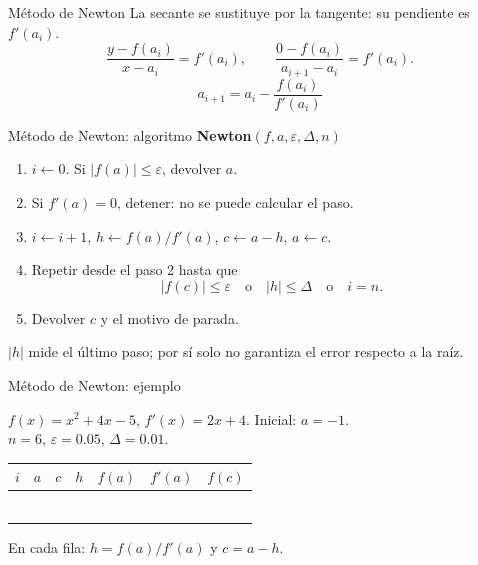 \documentclass[original_version/main.tex]{subfiles}
\begin{document}
\graphicspath{{imagenes/tema8/}{../imagenes/tema8/}}

\begin{frame}[t]{Método de Newton}
La secante se sustituye por la tangente: su pendiente es $f'(a_i)$.
\[\frac{y-f(a_i)}{x-a_i}=f'(a_i),\qquad
\frac{0-f(a_i)}{a_{i+1}-a_i}=f'(a_i).\]
\[\boxed{a_{i+1}=a_i-\frac{f(a_i)}{f'(a_i)}}\]
\end{frame}
\begin{frame}[t]{Método de Newton: algoritmo}
\small
\textbf{Newton}$(f,a,\varepsilon,\Delta,n)$
\begin{enumerate}
\item $i\gets0$. Si $|f(a)|\le\varepsilon$, devolver $a$.
\item Si $f'(a)=0$, detener: no se puede calcular el paso.
\item $i\gets i+1$, $h\gets f(a)/f'(a)$, $c\gets a-h$, $a\gets c$.
\item Repetir desde el paso 2 hasta que
\[|f(c)|\le\varepsilon\quad\text{o}\quad |h|\le\Delta\quad\text{o}\quad i=n.\]
\item Devolver $c$ y el motivo de parada.
\end{enumerate}
\medskip $|h|$ mide el último paso; por sí solo no garantiza el error respecto a la raíz.
\end{frame}
\begin{frame}[t]{Método de Newton: ejemplo}
\begin{minipage}[t][17mm]{\textwidth}\small
$f(x)=x^2+4x-5$, $f'(x)=2x+4$. Inicial: $a=-1$.\\
$n=6$, $\varepsilon=0.05$, $\Delta=0.01$.
\end{minipage}\begingroup\scriptsize\setlength{\tabcolsep}{2pt}
\begin{center}\begin{tabular}{|C{.04\textwidth}|*{6}{C{.135\textwidth}|}}\hline
$i$&$a$&$c$&$h$&$f(a)$&$f'(a)$&$f(c)$\\\hline
\rule{0pt}{5mm}&&&&&&\\\hline
\rule{0pt}{5mm}&&&&&&\\\hline
\rule{0pt}{5mm}&&&&&&\\\hline
\rule{0pt}{5mm}&&&&&&\\\hline
\rule{0pt}{5mm}&&&&&&\\\hline
\rule{0pt}{5mm}&&&&&&\\\hline
\end{tabular}\end{center}\endgroup\small En cada fila: $h=f(a)/f\prime(a)$ y $c=a-h$.
\end{frame}
\end{document}
